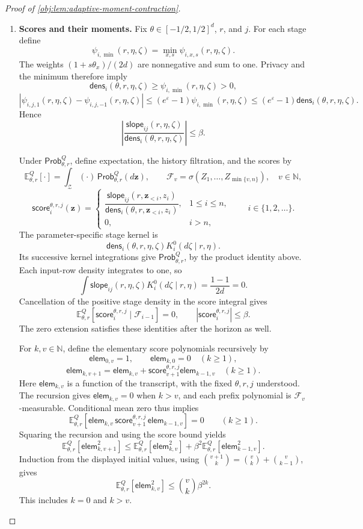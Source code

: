 \begin{proof}[Proof of \cref{obj:lem:adaptive-moment-contraction}]
\begin{enumerate}
\item \textbf{Scores and their moments.}
Fix \(\theta\in[-1/2,1/2]^d\), \(r\), and \(j\). For each stage define
\[
\psi_{i,\min}(r,\eta,\zeta)
=\min_{x,s}\psi_{i,x,s}(r,\eta,\zeta).
\]
The weights \((1+s\theta_x)/(2d)\) are nonnegative and sum to one. Privacy and the minimum therefore imply
\[
\mathsf{dens}_i(\theta,r,\eta,\zeta)
\ge\psi_{i,\min}(r,\eta,\zeta)>0,
\]
\[
\left|\psi_{i,j,1}(r,\eta,\zeta)
      -\psi_{i,j,-1}(r,\eta,\zeta)\right|
\le(e^\varepsilon-1)\psi_{i,\min}(r,\eta,\zeta)
\le(e^\varepsilon-1)\mathsf{dens}_i(\theta,r,\eta,\zeta).
\]
Hence
\[
\left|
\frac{\mathsf{slope}_{ij}(r,\eta,\zeta)}
     {\mathsf{dens}_i(\theta,r,\eta,\zeta)}
\right|
\le\beta.
\]

Under \(\mathsf{Prob}^Q_{\theta,r}\), define expectation, the history filtration, and the scores by
\[
\mathbb E^Q_{\theta,r}[\cdot]
=\int_{\mathcal Z}(\cdot)\,\mathsf{Prob}^Q_{\theta,r}(d\mathbf z),
\qquad
\mathcal F_v=\sigma(Z_1,\ldots,Z_{\min\{v,n\}}),
\quad v\in\mathbb N,
\]
\[
\mathsf{score}^{\theta,r,j}_i(\mathbf z)
=
\begin{cases}
\dfrac{\mathsf{slope}_{ij}(r,\mathbf z_{<i},z_i)}
      {\mathsf{dens}_i(\theta,r,\mathbf z_{<i},z_i)},
 &1\le i\le n,\\[6pt]
0,&i>n,
\end{cases}
\qquad i\in\{1,2,\ldots\}.
\]
The parameter-specific stage kernel is
\[
\mathsf{dens}_i(\theta,r,\eta,\zeta)
 K_i^0(d\zeta\mid r,\eta).
\]
Its successive kernel integrations give
\(\mathsf{Prob}^Q_{\theta,r}\), by the product identity above. Each input-row density integrates to one, so
\[
\int\mathsf{slope}_{ij}(r,\eta,\zeta)
 K_i^0(d\zeta\mid r,\eta)
=\frac{1-1}{2d}=0.
\]
Cancellation of the positive stage density in the score integral gives
\[
\mathbb E^Q_{\theta,r}
 [\mathsf{score}^{\theta,r,j}_i\mid\mathcal F_{i-1}]
=0,
\qquad
|\mathsf{score}^{\theta,r,j}_i|\le\beta.
\]
The zero extension satisfies these identities after the horizon as well.

For \(k,v\in\mathbb N\), define the elementary score polynomials recursively by
\[
\mathsf{elem}_{0,v}=1,
\qquad
\mathsf{elem}_{k,0}=0\quad(k\ge1),
\]
\[
\mathsf{elem}_{k,v+1}
=\mathsf{elem}_{k,v}
+\mathsf{score}^{\theta,r,j}_{v+1}\mathsf{elem}_{k-1,v}
\quad(k\ge1).
\]
Here \(\mathsf{elem}_{k,v}\) is a function of the transcript, with the fixed
\(\theta,r,j\) understood. The recursion gives
\(\mathsf{elem}_{k,v}=0\) when \(k>v\), and each prefix polynomial is
\(\mathcal F_v\)-measurable. Conditional mean zero thus implies
\[
\mathbb E^Q_{\theta,r}
 \left[
 \mathsf{elem}_{k,v}\,
 \mathsf{score}^{\theta,r,j}_{v+1}\,
 \mathsf{elem}_{k-1,v}
 \right]=0
\qquad(k\ge1).
\]
Squaring the recursion and using the score bound yields
\[
\mathbb E^Q_{\theta,r}[\mathsf{elem}_{k,v+1}^2]
\le
\mathbb E^Q_{\theta,r}[\mathsf{elem}_{k,v}^2]
+\beta^2\mathbb E^Q_{\theta,r}[\mathsf{elem}_{k-1,v}^2].
\]
Induction from the displayed initial values, using
\(\binom{v+1}{k}=\binom vk+\binom v{k-1}\), gives
\[
\mathbb E^Q_{\theta,r}[\mathsf{elem}_{k,v}^2]
\le\binom vk\beta^{2k}.
\]
This includes \(k=0\) and \(k>v\).


\end{enumerate}
\end{proof}
